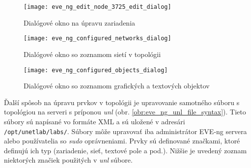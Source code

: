 \begin{enumerate}[noitemsep]
\begin{figure}
    \centering
    \texttt{[image: eve\_ng\_edit\_node\_3725\_edit\_dialog]}
    \caption{Dialógové okno na úpravu zariadenia}
    \label{obr:eve_ng_edit_node_dialog}
\end{figure}

\begin{figure}
    \centering
    \texttt{[image: eve\_ng\_configured\_networks\_dialog]}
    \caption{Dialógové okno so zoznamom sietí v topológii}
    \label{obr:eve_ng_configured_networks_dialog}
\end{figure}

\begin{figure}
    \centering
    \texttt{[image: eve\_ng\_configured\_objects\_dialog]}
    \caption{Dialógové okno so zoznamom grafických a textových objektov}
    \label{obr:eve_ng_configured_objects_dialog}
\end{figure}



    
Ďalší spôsob na úpravu prvkov v topológii je upravovanie samotného súboru s topológiou na serveri s príponou \emph{unl} (obr. \ref{obr:eve_ng_unl_file_syntax}). Tieto súbory sú napísané vo formáte XML a sú uložené v adresári \texttt{/opt/unetlab/labs/}. Súbory môže upravovať iba administrátor EVE-ng servera alebo používatelia so \emph{sudo} oprávneniami. Prvky sú definované značkami, ktoré definujú ich typ (zariadenie, sieť, textové pole a pod.). Nižšie je uvedený zoznam niektorých značiek použitých v \emph{unl} súbore.


\end{enumerate}
